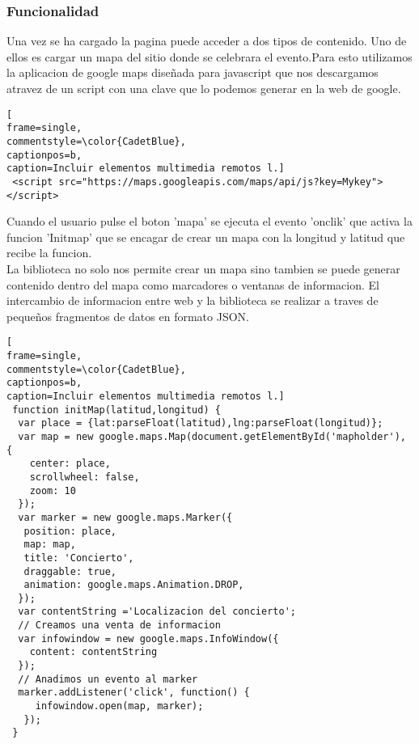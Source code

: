 \subsubsection{Funcionalidad}
Una vez se ha cargado la pagina puede acceder a dos tipos de contenido. Uno de ellos es cargar un mapa del sitio donde se celebrara el  evento.Para esto utilizamos la aplicacion de  google maps diseñada para javascript que nos descargamos  atravez de un script con una clave que lo podemos generar en la web de google.
\lstset{language=, breaklines=true, basicstyle=\footnotesize}
\begin{lstlisting}[
frame=single,
commentstyle=\color{CadetBlue},
captionpos=b,
caption=Incluir elementos multimedia remotos l.]
 <script src="https://maps.googleapis.com/maps/api/js?key=Mykey"></script>
\end{lstlisting}
Cuando el usuario pulse el boton 'mapa' se  ejecuta el evento 'onclik' que activa la funcion 'Initmap' que se encagar de crear un mapa con la longitud y latitud que recibe la funcion.
\\La biblioteca no solo nos permite crear un mapa sino tambien se puede generar contenido dentro del mapa como marcadores o ventanas de informacion.
El intercambio de informacion entre web y la biblioteca se realizar a traves de pequeños fragmentos de datos en formato JSON.
\lstset{language=, breaklines=true, basicstyle=\footnotesize}
\begin{lstlisting}[
frame=single,
commentstyle=\color{CadetBlue},
captionpos=b,
caption=Incluir elementos multimedia remotos l.]
 function initMap(latitud,longitud) {
  var place = {lat:parseFloat(latitud),lng:parseFloat(longitud)};
  var map = new google.maps.Map(document.getElementById('mapholder'), {
    center: place,
    scrollwheel: false,
    zoom: 10
  });
  var marker = new google.maps.Marker({
   position: place,
   map: map,
   title: 'Concierto',
   draggable: true,
   animation: google.maps.Animation.DROP,
  });
  var contentString ='Localizacion del concierto';
  // Creamos una venta de informacion
  var infowindow = new google.maps.InfoWindow({
    content: contentString
  });
  // Anadimos un evento al marker
  marker.addListener('click', function() {
     infowindow.open(map, marker);
   });
 }
\end{lstlisting}
